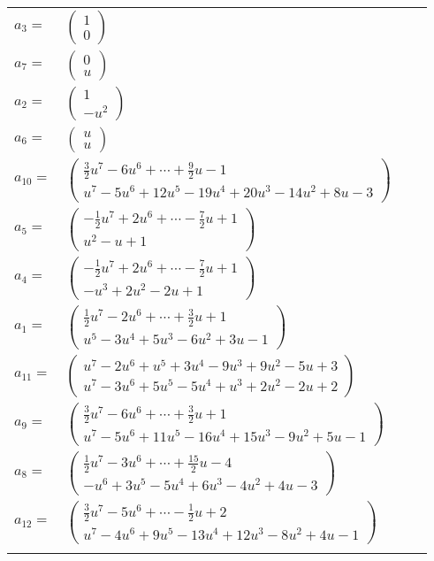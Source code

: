 \documentclass[1p]{elsarticle_modified}
\theoremstyle{definition}
\begin{document}
\begin{tabular}{m{7pt} m{180pt} m{7pt} m{180pt} }
\flushright $a_{3}=$&$\begin{pmatrix}1\\0\end{pmatrix}$ \\
\flushright $a_{7}=$&$\begin{pmatrix}0\\u\end{pmatrix}$ \\
\flushright $a_{2}=$&$\begin{pmatrix}1\\- u^2\end{pmatrix}$ \\
\flushright $a_{6}=$&$\begin{pmatrix}u\\u\end{pmatrix}$ \\
\flushright $a_{10}=$&$\begin{pmatrix}\frac{3}{2} u^7-6 u^6+\cdots+\frac{9}{2} u-1\\u^7-5 u^6+12 u^5-19 u^4+20 u^3-14 u^2+8 u-3\end{pmatrix}$ \\
\flushright $a_{5}=$&$\begin{pmatrix}-\frac{1}{2} u^7+2 u^6+\cdots-\frac{7}{2} u+1\\u^2- u+1\end{pmatrix}$ \\
\flushright $a_{4}=$&$\begin{pmatrix}-\frac{1}{2} u^7+2 u^6+\cdots-\frac{7}{2} u+1\\- u^3+2 u^2-2 u+1\end{pmatrix}$ \\
\flushright $a_{1}=$&$\begin{pmatrix}\frac{1}{2} u^7-2 u^6+\cdots+\frac{3}{2} u+1\\u^5-3 u^4+5 u^3-6 u^2+3 u-1\end{pmatrix}$ \\
\flushright $a_{11}=$&$\begin{pmatrix}u^7-2 u^6+u^5+3 u^4-9 u^3+9 u^2-5 u+3\\u^7-3 u^6+5 u^5-5 u^4+u^3+2 u^2-2 u+2\end{pmatrix}$ \\
\flushright $a_{9}=$&$\begin{pmatrix}\frac{3}{2} u^7-6 u^6+\cdots+\frac{3}{2} u+1\\u^7-5 u^6+11 u^5-16 u^4+15 u^3-9 u^2+5 u-1\end{pmatrix}$ \\
\flushright $a_{8}=$&$\begin{pmatrix}\frac{1}{2} u^7-3 u^6+\cdots+\frac{15}{2} u-4\\- u^6+3 u^5-5 u^4+6 u^3-4 u^2+4 u-3\end{pmatrix}$ \\
\flushright $a_{12}=$&$\begin{pmatrix}\frac{3}{2} u^7-5 u^6+\cdots-\frac{1}{2} u+2\\u^7-4 u^6+9 u^5-13 u^4+12 u^3-8 u^2+4 u-1\end{pmatrix}$\\&\end{tabular}
\end{document}
